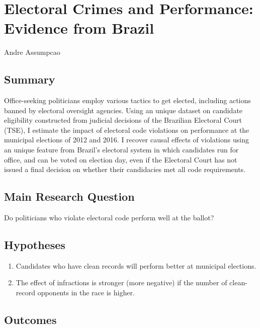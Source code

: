 \documentclass[]{article}
\title{}
\author{}
\date{}
\begin{document}
\hypertarget{title}{%
\section{Electoral Crimes and Performance: Evidence from
Brazil}\label{title}}

Andre Assumpcao

\hypertarget{summary}{%
\subsection{Summary}\label{summary}}

Office-seeking politicians employ various tactics to get elected,
including actions banned by electoral oversight agencies. Using an
unique dataset on candidate eligibility constructed from judicial
decisions of the Brazilian Electoral Court (TSE), I estimate the impact
of electoral code violations on performance at the municipal elections
of 2012 and 2016. I recover causal effects of violations using an unique
feature from Brazil's electoral system in which candidates run for
office, and can be voted on election day, even if the Electoral Court
has not issued a final decision on whether their candidacies met all
code requirements.

\hypertarget{main-research-question}{%
\subsection{Main Research Question}\label{main-research-question}}

Do politicians who violate electoral code perform well at the ballot?

\hypertarget{hypotheses}{%
\subsection{Hypotheses}\label{hypotheses}}

\begin{enumerate}
\item
  Candidates who have clean records will perform better at municipal
  elections.
\item
  The effect of infractions is stronger (more negative) if the number of
  clean-record opponents in the race is higher.
\end{enumerate}

\hypertarget{outcomes}{%
\subsection{Outcomes}\label{outcomes}}
\end{document}
